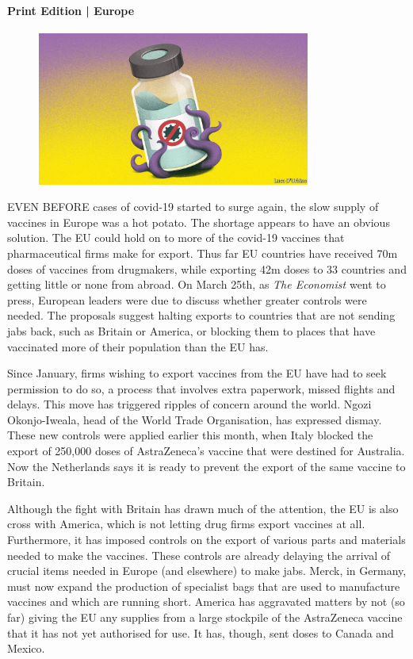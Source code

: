 \documentclass{article}
\begin{document}
\paragraph{Print Edition | Europe  \quad \color{gray}{Mar 25th 2021 }}
\begin{figure}[h]
\centering
\includegraphics[width=0.8\textwidth]{images/20210327_eud001.jpg}
\end{figure}
\lettrine{E}VEN BEFORE cases of covid-19 started to surge again, the slow supply of vaccines in Europe was a hot potato. The shortage appears to have an obvious solution. The EU could hold on to more of the covid-19 vaccines that pharmaceutical firms make for export. Thus far EU countries have received 70m doses of vaccines from drugmakers, while exporting 42m doses to 33 countries and getting little or none from abroad. On March 25th, as \emph{The Economist} went to press, European leaders were due to discuss whether greater controls were needed. The proposals suggest halting exports to countries that are not sending jabs back, such as Britain or America, or blocking them to places that have vaccinated more of their population than the EU has. 

Since January, firms wishing to export vaccines from the EU have had to seek permission to do so, a process that involves extra paperwork, missed flights and delays. This move has triggered ripples of concern around the world. Ngozi Okonjo-Iweala, head of the World Trade Organisation, has expressed dismay. These new controls were applied earlier this month, when Italy blocked the export of 250,000 doses of AstraZeneca's vaccine that were destined for Australia. Now the Netherlands says it is ready to prevent the export of the same vaccine to Britain. 

Although the fight with Britain has drawn much of the attention, the EU is also cross with America, which is not letting drug firms export vaccines at all. Furthermore, it has imposed controls on the export of various parts and materials needed to make the vaccines. These controls are already delaying the arrival of crucial items needed in Europe (and elsewhere) to make jabs. Merck, in Germany, must now expand the production of specialist bags that are used to manufacture vaccines and which are running short. America has aggravated matters by not (so far) giving the EU any supplies from a large stockpile of the AstraZeneca vaccine that it has not yet authorised for use. It has, though, sent doses to Canada and Mexico. 
\end{document}
